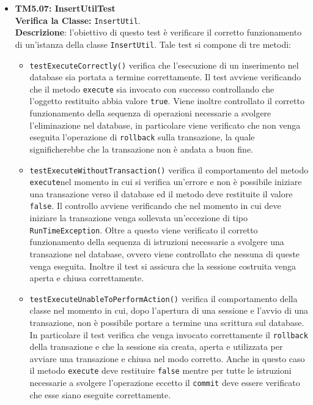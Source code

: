 \begin{itemize}
\item \textbf{TM5.07: InsertUtilTest}\\
\textbf{Verifica la Classe:} \texttt{InsertUtil}.\\
\textbf{Descrizione}: l'obiettivo di questo test è verificare il corretto funzionamento di un'istanza della classe \texttt{InsertUtil}.
Tale test si compone di tre metodi:
\begin{itemize}
\item \texttt{testExecuteCorrectly()} 
verifica che l'esecuzione di un inserimento nel database sia portata a termine correttamente. Il test avviene verificando che il metodo \texttt{execute} sia invocato con successo controllando che l'oggetto restituito abbia valore \texttt{true}. Viene inoltre controllato il corretto funzionamento della sequenza di operazioni necessarie a svolgere l'eliminazione nel database, in particolare viene verificato che non venga eseguita l'operazione di \texttt{rollback} sulla transazione, la quale significherebbe che la transazione non è andata a buon fine.

\item \texttt{testExecuteWithoutTransaction()}  verifica il comportamento del metodo \texttt{execute}nel momento in cui si verifica un'errore e non è possibile iniziare una transazione verso il database ed il metodo deve restituite il valore \texttt{false}. Il controllo avviene verificando che nel momento in cui deve iniziare la transazione venga sollevata un'eccezione di tipo \texttt{RunTimeException}. Oltre a questo viene verificato il corretto funzionamento della sequenza di istruzioni necessarie a svolgere una transazione nel database, ovvero viene controllato che nessuna di queste venga eseguita. Inoltre il test si assicura che la sessione costruita venga aperta e chiusa correttamente.

\item \texttt{testExecuteUnableToPerformAction()} verifica il comportamento della classe nel momento in cui, dopo l'apertura di una sessione e l'avvio di una transazione, non è possibile portare a termine una scrittura sul database. In particolare il test verifica che venga invocato correttamente il \texttt{rollback} della transazione e che la sessione sia creata, aperta e utilizzata per avviare una transazione e chiusa nel modo corretto. Anche in questo caso il metodo \texttt{execute} deve restituire \texttt{false} mentre per tutte le istruzioni necessarie a svolgere l'operazione eccetto il \texttt{commit} deve essere verificato che esse siano eseguite correttamente.


\end{itemize}
\end{itemize}
